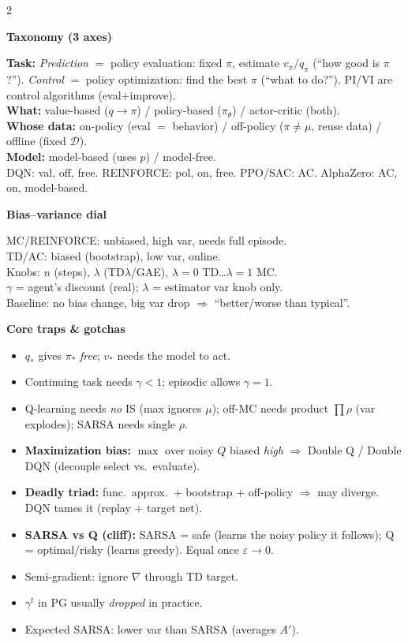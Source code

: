 \documentclass[a4paper]{article}
\newcommand{\hd}[1]{%
  \par\addvspace{3.6pt}%
  {\color{accent}\bfseries\small #1}\par
  \vspace{-4pt}{\color{accent!45}\rule{\linewidth}{0.4pt}}\par\vspace{1.2pt}}
\newcommand{\grad}{\nabla}
\newcommand{\dataset}{\mathcal{D}}
\begin{document}
\newpage
\begin{multicols}{2}

\hd{Taxonomy (3 axes)}
\textbf{Task:} \emph{Prediction} $=$ policy evaluation: fixed $\pi$, estimate $v_\pi/q_\pi$ (``how good is $\pi$?''). \emph{Control} $=$ policy optimization: find the best $\pi$ (``what to do?''). PI/VI are control algorithms (eval$+$improve).\\
\textbf{What:} value-based ($q\to\pi$) / policy-based ($\pi_\theta$) / actor-critic (both).\\
\textbf{Whose data:} on-policy (eval $=$ behavior) / off-policy ($\pi\neq\mu$, reuse data) / offline (fixed $\dataset$).\\
\textbf{Model:} model-based (uses $p$) / model-free.\\
DQN: val, off, free. REINFORCE: pol, on, free. PPO/SAC: AC. AlphaZero: AC, on, model-based.

\hd{Bias–variance dial}
MC/REINFORCE: unbiased, high var, needs full episode.\\
TD/AC: biased (bootstrap), low var, online.\\
Knobs: $n$ (steps), $\lambda$ (TD$\lambda$/GAE), $\lambda{=}0$ TD…$\lambda{=}1$ MC.\\
$\gamma$ = agent's discount (real); $\lambda$ = estimator var knob only.\\
Baseline: no bias change, big var drop $\Rightarrow$ ``better/worse than typical''.

\hd{Core traps \& gotchas}
\begin{itemize}
\item $q_*$ gives $\pi_*$ \emph{free}; $v_*$ needs the model to act.
\item Continuing task needs $\gamma{<}1$; episodic allows $\gamma{=}1$.
\item Q-learning needs \emph{no} IS (max ignores $\mu$); off-MC needs product $\prod\rho$ (var explodes); SARSA needs single $\rho$.
\item \textbf{Maximization bias:} $\max$ over noisy $Q$ biased \emph{high} $\Rightarrow$ Double Q / Double DQN (decouple select vs.\ evaluate).
\item \textbf{Deadly triad:} func.\ approx.\ + bootstrap + off-policy $\Rightarrow$ may diverge. DQN tames it (replay + target net).
\item \textbf{SARSA vs Q (cliff):} SARSA = safe (learns the noisy policy it follows); Q = optimal/risky (learns greedy). Equal once $\varepsilon{\to}0$.
\item Semi-gradient: ignore $\grad$ through TD target.
\item $\gamma^t$ in PG usually \emph{dropped} in practice.
\item Expected SARSA: lower var than SARSA (averages $A'$).
\end{itemize}


\end{multicols}
\end{document}
